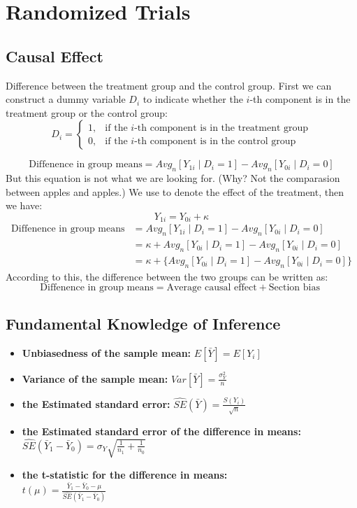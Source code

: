 \documentclass[10pt, a4paper]{article}
\begin{document}
\section{Randomized Trials} 
\subsection{Causal Effect}
Difference between the treatment group and the control group.
First we can construct a dummy variable $D_i$ to indicate whether the $i$-th component is in the treatment group or the control group:
\[D_i = \begin{cases}
1, & \text{if the $i$-th component is in the treatment group} \\
0, & \text{if the $i$-th component is in the control group}
\end{cases}\]

\[\text{Diffenence in group means} = Avg_n[Y_{1i} \mid D_i = 1] - Avg_n[Y_{0i} \mid D_i = 0] \]
But this equation is not what we are looking for. (Why? Not the comparasion between apples and apples.) We use \kappa to denote the effect of the treatment, then we have:
\[ Y_{1i} = Y_{0i} + \kappa \]
\begin{align*}
    \text{Diffenence in group means} &= Avg_n[Y_{1i} \mid D_i = 1] - Avg_n[Y_{0i} \mid D_i = 0] \\
    &= {\kappa + Avg_n[Y_{0i} \mid D_i = 1]} - Avg_n[Y_{0i} \mid D_i = 0] \\
    &= \kappa + \{Avg_n[Y_{0i} \mid D_i = 1] - Avg_n[Y_{0i} \mid D_i = 0]\}
\end{align*}
According to this, the difference between the two groups can be written as:
\[\boxed{\text{Diffenence in group means} = \text{Average causal effect} + \text{Section bias }}\]  

\subsection{Fundamental Knowledge of Inference}
\begin{itemize}
    \item \textbf{Unbiasedness of the sample mean:} $E[\bar{Y}] = E[Y_i]$
    \item \textbf{Variance of the sample mean:} $Var[\bar{Y}] = \frac{\sigma^2_Y}{n}$
    \item \textbf{the Estimated standard error:} $\hat{SE}(\bar{Y}) = \frac{S(Y_i)}{\sqrt{n}}$
    \item \textbf{the Estimated standard error of the difference in means:} \\
    $\hat{SE}(\bar{Y}_1 - \bar{Y}_0) = \sigma_Y \sqrt{\frac{1}{n_1} + \frac{1}{n_0}}$
    \item \textbf{the t-statistic for the difference in means:} \\
    $t(\mu) = \frac{\bar{Y}_1 - \bar{Y}_0 - \mu}{\hat{SE}(\bar{Y}_1 - \bar{Y}_0)}$
\end{itemize} 
\end{document}
